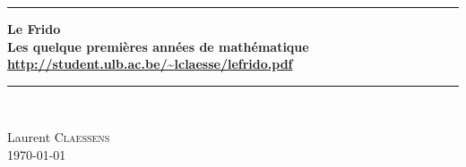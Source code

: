 



\thispagestyle{empty}
\begin{center}
  \begin{minipage}{15cm}
    \hrule\par
    \vspace{2mm}
    \begin{center}
        \Huge \bfseries Le Frido \\  {\small Les quelque premières années de mathématique }     %
    \normalsize
    \url{http://student.ulb.ac.be/~lclaesse/lefrido.pdf}
    \end{center}
    \hrule\par
  \end{minipage}\\
  \vspace{0.2cm}
\end{center}

\vspace{2cm}

\begin{center}
    Laurent \textsc{Claessens}\\
    \today

    \vspace{1cm}

\end{center}

\vfill






